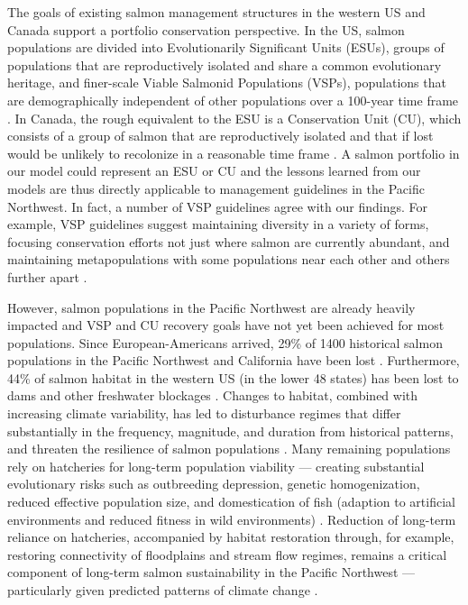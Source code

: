 The goals of existing salmon management structures in the western US and Canada support a portfolio conservation perspective. In the US, salmon populations are divided into Evolutionarily Significant Units (ESUs), groups of populations that are reproductively isolated and share a common evolutionary heritage, and finer-scale Viable Salmonid Populations (VSPs), populations that are demographically independent of other populations over a 100-year time frame \citep{mcelhany2000}. In Canada, the rough equivalent to the ESU is a Conservation Unit (CU), which consists of a group of salmon that are reproductively isolated and that if lost would be unlikely to recolonize in a reasonable time frame \citep{dfo2005wsp}. A salmon portfolio in our model could represent an ESU or CU and the lessons learned from our models are thus directly applicable to management guidelines in the Pacific Northwest. In fact, a number of VSP guidelines agree with our findings. For example, VSP guidelines suggest maintaining diversity in a variety of forms, focusing conservation efforts not just where salmon are currently abundant, and maintaining metapopulations with some populations near each other and others further apart \citep{mcelhany2000}.

However, salmon populations in the Pacific Northwest are already heavily impacted \citep[e.g.][]{gustafson2007} and VSP and CU recovery goals have not yet been achieved for most populations. Since European-Americans arrived, 29\% of 1400 historical salmon populations in the Pacific Northwest and California have been lost \citep{gustafson2007}. Furthermore, 44\% of salmon habitat in the western US (in the lower 48 states) has been lost to dams and other freshwater blockages \citep{mcclure2008a}. Changes to habitat, combined with increasing climate variability, has led to disturbance regimes that differ substantially in the frequency, magnitude, and duration from historical patterns, and threaten the resilience of salmon populations \citep{waples2009}. Many remaining populations rely on hatcheries for long-term population viability --- creating substantial evolutionary risks such as outbreeding depression, genetic homogenization, reduced effective population size, and domestication of fish (adaption to artificial environments and reduced fitness in wild environments) \citep{mcclure2008b}. Reduction of long-term reliance on hatcheries, accompanied by habitat restoration through, for example, restoring connectivity of floodplains and stream flow regimes, remains a critical component of long-term salmon sustainability in the Pacific Northwest --- particularly given predicted patterns of climate change \citep{beechie2013}.

